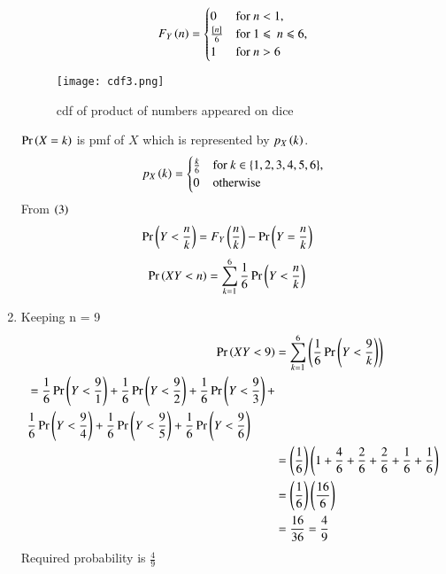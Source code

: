 \documentclass[journal,12pt,onecolumn]{IEEEtran}
\begin{document}
\begin{enumerate}[label=(\alph*)]
                        \begin{align}
                                F_Y\left(n\right) = \begin{cases} 0 & \text{for $n < 1$}, \\ \frac{{}\left[n\right]}{6} & \text{for } 1 \leqslant\: n \leqslant 6 ,\\ 1 & \text{for $n > 6$} \end{cases}
                        \end{align}
			\begin{figure}
				\captionsetup{width=\columnwidth}
				\texttt{[image: cdf3.png]}
				\caption{cdf of product of numbers appeared on dice}
				\label{fig:cdf3}
			\end{figure}
			$\Pr\left(X=k\right)$ is pmf of $X$ which is represented by $p_X\left(k\right)$.
                         \begin{align}
				 p_X\left(k\right) =\begin{cases} \frac{k}{6}  & \text{for $k \in \{1,2,3,4,5,6\}$}, \\ 0 & \text{otherwise} \end{cases} 
                         \end{align}
                        From $\left(3\right)$
			\begin{align}
			\Pr\left(Y < \frac{n}{k}\right) &= F_Y\left(\frac{n}{k}\right) - \Pr\left(Y = \frac{n}{k}\right)
                                \end{align}
				\begin{align}
				\Pr\left(XY < n\right) &= \sum_{k=1}^{6}\frac{1}{6}\Pr\left(Y < \frac{n}{k}\right)
				\end{align}
		 \item Keeping n = 9
			\begin{align}
			  \Pr\left(XY < 9\right) &= \sum_{k=1}^{6}\left(\frac{1}{6}\Pr\left(Y < \frac{9}{k}\right)\right) \\
				 \begin{split} &= \frac{1}{6}\Pr\left(Y < \frac{9}{1}\right) +\frac{1}{6}\Pr\left(Y < \frac{9}{2}\right) +\frac{1}{6}\Pr\left(Y < \frac{9}{3}\right) + \\ 
					 & \frac{1}{6}\Pr\left(Y < \frac{9}{4}\right) +\frac{1}{6}\Pr\left(Y < \frac{9}{5}\right) +\frac{1}{6}\Pr\left(Y < \frac{9}{6}\right) \\
				 \end{split} \\
			  &= \left(\frac{1}{6}\right)\left(1 + \frac{4}{6} + \frac{2}{6} + \frac{2}{6} + \frac{1}{6} +\frac{1}{6}\right) \\
			  &= \left(\frac{1}{6}\right)\left(\frac{16}{6}\right) \\
			  &= \frac{16}{36}= \frac{4}{9}
			 \end{align}
        Required probability is $\frac{4}{9}$
 \end{enumerate} 
 
\end{document}
